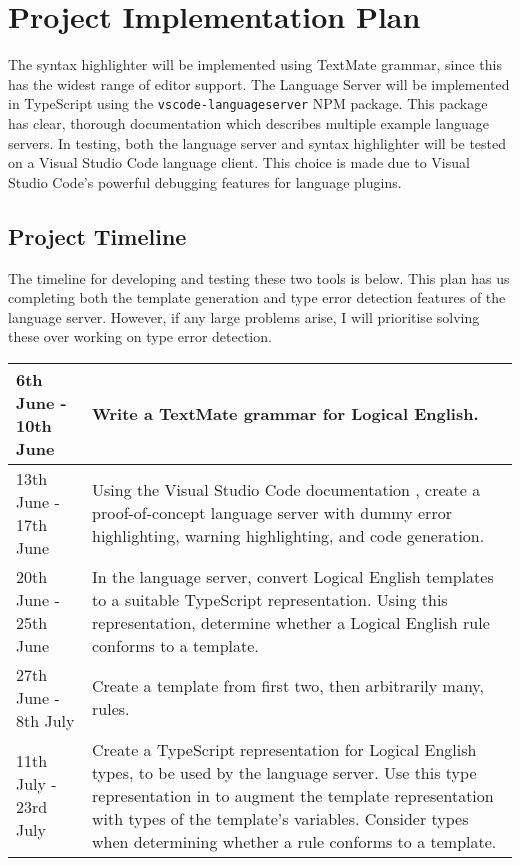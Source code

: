 \documentclass[../main.tex]{subfiles}
\begin{document}
\section{Project Implementation Plan}
The syntax highlighter will be implemented using TextMate grammar, since this has the widest range of editor support.  The Language Server will be implemented in TypeScript using the \texttt{vscode-languageserver} NPM package. This package has clear, thorough documentation which describes multiple example language servers. In testing, both the language server and syntax highlighter will be tested on a Visual Studio Code language client. This choice is made due to Visual Studio Code's powerful debugging features for language plugins.

\subsection{Project Timeline}
The timeline for developing and testing these two tools is below. This plan has us completing both the template generation and type error detection features of the language server. However, if any large problems arise, I will prioritise solving these over working on type error detection.
\\
\begin{tabularx}{\textwidth}{|l|X|}
    \hline
    6th June - 10th June & 
    Write a TextMate grammar for Logical English.
    \\
    \hline
    13th June - 17th June & 
    Using the Visual Studio Code documentation \cite[]{vsc_langserver_features}, create a proof-of-concept language server with dummy error highlighting, warning highlighting, and code generation.
    \\ \hline
    20th June - 25th June & 
    In the language server, convert Logical English templates to a suitable TypeScript representation. \newline
    Using this representation, determine whether a Logical English rule conforms to a template.
    \\ \hline
    27th June - 8th July & 
    Create a template from first two, then arbitrarily many, rules.
    \\ \hline
    11th July - 23rd July & 
    Create a TypeScript representation for Logical English types, to be used by the language server. \newline
    Use this type representation in to augment the template representation with types of the template's variables. \newline
    Consider types when determining whether a rule conforms to a template.
    \\ \hline
\end{tabularx}
\end{document}
